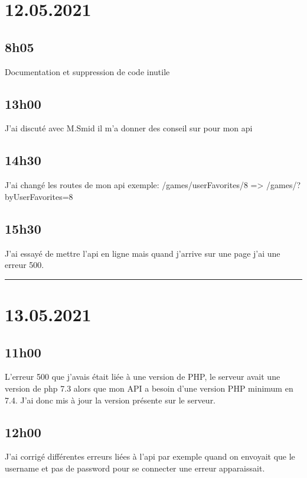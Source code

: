 \documentclass[a4paper,12pt,french]{sphinxmanual}
\begin{document}
\section{12.05.2021}
\label{\detokenize{logbook:id104}}

\subsection{8h05}
\label{\detokenize{logbook:id105}}
\sphinxAtStartPar
Documentation et suppression de code inutile


\subsection{13h00}
\label{\detokenize{logbook:id106}}
\sphinxAtStartPar
J’ai discuté avec M.Smid il m’a donner des conseil sur pour mon api


\subsection{14h30}
\label{\detokenize{logbook:id107}}
\sphinxAtStartPar
J’ai changé les routes de mon api
exemple:
/games/userFavorites/8  => /games/?byUserFavorites=8


\subsection{15h30}
\label{\detokenize{logbook:id108}}
\sphinxAtStartPar
J’ai essayé de mettre l’api en ligne mais quand j’arrive sur une page j’ai une erreur 500.


\bigskip\hrule\bigskip



\section{13.05.2021}
\label{\detokenize{logbook:id109}}

\subsection{11h00}
\label{\detokenize{logbook:id110}}
\sphinxAtStartPar
L’erreur 500 que j’avais était liée à une version de PHP, le serveur avait une version de php 7.3 alors que mon API a besoin d’une version PHP minimum en 7.4.
J’ai donc mis à jour la version présente sur le serveur.


\subsection{12h00}
\label{\detokenize{logbook:id111}}
\sphinxAtStartPar
J’ai corrigé différentes erreurs liées à l’api par exemple quand on envoyait que le username et pas de password pour se connecter une erreur apparaissait.
\end{document}
